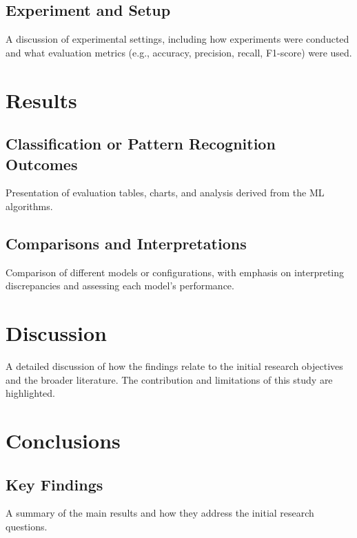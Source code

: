 \documentclass[a4paper,12pt]{report}
\begin{document}
\section{Experiment and Setup}
A discussion of experimental settings, including how experiments were conducted and what evaluation metrics (e.g., accuracy, precision, recall, F1-score) were used.

\chapter{Results}

\section{Classification or Pattern Recognition Outcomes}
Presentation of evaluation tables, charts, and analysis derived from the ML algorithms.

\section{Comparisons and Interpretations}
Comparison of different models or configurations, with emphasis on interpreting discrepancies and assessing each model’s performance.

\chapter{Discussion}

A detailed discussion of how the findings relate to the initial research objectives and the broader literature. The contribution and limitations of this study are highlighted.

\chapter{Conclusions}

\section{Key Findings}
A summary of the main results and how they address the initial research questions.
\end{document}
